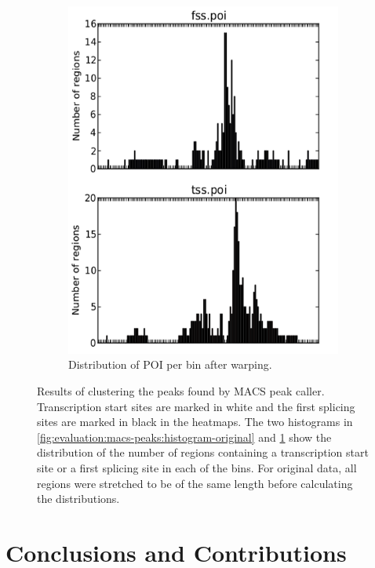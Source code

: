 \documentclass[parskip]{cs4rep}
\begin{document}
\begin{figure}
\begin{subfigure}[b]{0.45\textwidth}
        \includegraphics[width=\textwidth]{figures/evaluation/macs-peaks/cluster-35-warped-histogram-clean.png}
        \caption{Distribution of POI per bin after warping.}
        \label{fig:evaluation:macs-peaks:histogram-warped}
    \end{subfigure}
    \caption{Results of clustering the peaks found by MACS peak caller. Transcription start sites are marked in white and the first splicing sites are marked in black in the heatmaps. The two histograms in \ref{fig:evaluation:macs-peaks:histogram-original} and \ref{fig:evaluation:macs-peaks:histogram-warped} show the distribution of the number of regions containing a transcription start site or a first splicing site in each of the bins. For original data, all regions were stretched to be of the same length before calculating the distributions.}
    \label{fig:evaluation:macs-peaks}

    
    
\end{figure}



\chapter{Conclusions and Contributions}




\appendix
{}
\end{document}
